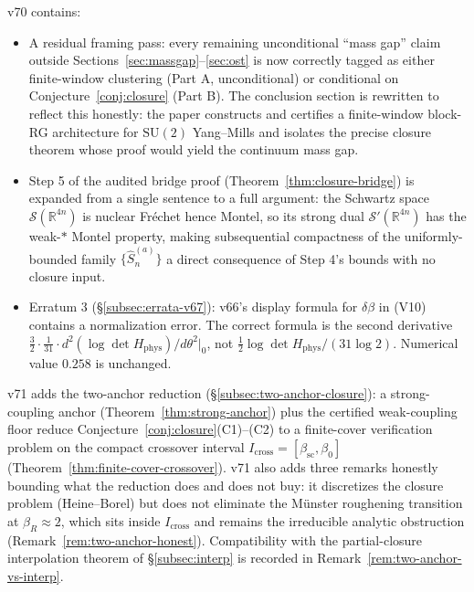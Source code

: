 \documentclass[11pt]{article}
\theoremstyle{definition}
\newcommand{\SU}{\mathrm{SU}}
\newcommand{\R}{\mathbb{R}}
\newcommand{\betasc}{\beta_{\mathrm{sc}}}
\begin{document}
v70 contains:
\begin{itemize}[nosep]
\item A residual framing pass: every remaining unconditional ``mass
gap'' claim outside Sections~\ref{sec:massgap}--\ref{sec:ost} is now
correctly tagged as either finite-window clustering \textup{(}Part A,
unconditional\textup{)} or conditional on
Conjecture~\ref{conj:closure} \textup{(}Part B\textup{)}.  The
conclusion section is rewritten to reflect this honestly: the paper
constructs and certifies a finite-window block-RG architecture for
$\SU(2)$ Yang--Mills and isolates the precise closure theorem whose
proof would yield the continuum mass gap.
\item Step 5 of the audited bridge proof
\textup{(}Theorem~\ref{thm:closure-bridge}\textup{)} is expanded
from a single sentence to a full argument: the Schwartz space
$\mathcal S(\R^{4n})$ is nuclear Fr\'echet hence Montel, so its
strong dual $\mathcal S'(\R^{4n})$ has the weak-$*$ Montel property,
making subsequential compactness of the uniformly-bounded family
$\{\hat S_n^{(a)}\}$ a direct consequence of Step 4's bounds with no
closure input.
\item Erratum 3 \textup{(}\S\ref{subsec:errata-v67}\textup{)}: v66's
display formula for $\delta\beta$ in (V10) contains a normalization
error.  The correct formula is the second derivative
$\frac{3}{2}\cdot\frac{1}{31}\cdot d^2(\log\det H_{\mathrm{phys}})/d\theta^2|_0$,
not $\frac{1}{2}\log\det H_{\mathrm{phys}}/(31\log 2)$.  Numerical
value $0.258$ is unchanged.
\end{itemize}

v71 adds the two-anchor reduction
\textup{(}\S\ref{subsec:two-anchor-closure}\textup{)}: a
strong-coupling anchor \textup{(}Theorem~\ref{thm:strong-anchor}\textup{)}
plus the certified weak-coupling floor reduce
Conjecture~\ref{conj:closure}(C1)--(C2) to a finite-cover
verification problem on the compact crossover interval
$I_{\mathrm{cross}}=[\betasc,\beta_0]$
\textup{(}Theorem~\ref{thm:finite-cover-crossover}\textup{)}.  v71
also adds three remarks honestly bounding what the reduction does
and does not buy: it discretizes the closure problem
\textup{(}Heine--Borel\textup{)} but does not eliminate the M\"unster
roughening transition at $\beta_R\approx 2$, which sits inside
$I_{\mathrm{cross}}$ and remains the irreducible analytic obstruction
\textup{(}Remark~\ref{rem:two-anchor-honest}\textup{)}.  Compatibility
with the partial-closure interpolation theorem of \S\ref{subsec:interp}
is recorded in Remark~\ref{rem:two-anchor-vs-interp}.
\end{document}
